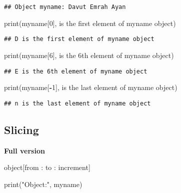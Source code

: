 \documentclass[
]{book}
\newenvironment{Shaded}{\begin{snugshade}}{\end{snugshade}}
\newcommand{\BuiltInTok}[1]{#1}
\newcommand{\DecValTok}[1]{\textcolor[rgb]{0.00,0.00,0.81}{#1}}
\newcommand{\NormalTok}[1]{#1}
\newcommand{\OperatorTok}[1]{\textcolor[rgb]{0.81,0.36,0.00}{\textbf{#1}}}
\newcommand{\StringTok}[1]{\textcolor[rgb]{0.31,0.60,0.02}{#1}}
\begin{document}
\begin{verbatim}
## Object myname: Davut Emrah Ayan
\end{verbatim}

\begin{Shaded}
\begin{Highlighting}[]
\BuiltInTok{print}\NormalTok{(myname[}\DecValTok{0}\NormalTok{], }\StringTok{\textquotesingle{}is the first element of myname object\textquotesingle{}}\NormalTok{)}
\end{Highlighting}
\end{Shaded}

\begin{verbatim}
## D is the first element of myname object
\end{verbatim}

\begin{Shaded}
\begin{Highlighting}[]
\BuiltInTok{print}\NormalTok{(myname[}\DecValTok{6}\NormalTok{], }\StringTok{\textquotesingle{}is the 6th element of myname object\textquotesingle{}}\NormalTok{)}
\end{Highlighting}
\end{Shaded}

\begin{verbatim}
## E is the 6th element of myname object
\end{verbatim}

\begin{Shaded}
\begin{Highlighting}[]
\BuiltInTok{print}\NormalTok{(myname[}\OperatorTok{{-}}\DecValTok{1}\NormalTok{], }\StringTok{\textquotesingle{}is the last element of myname object\textquotesingle{}}\NormalTok{)}
\end{Highlighting}
\end{Shaded}

\begin{verbatim}
## n is the last element of myname object
\end{verbatim}

\hypertarget{slicing}{%
\subsection{Slicing}\label{slicing}}

\textbf{Full version}

object{[}from : to : increment{]}

\begin{Shaded}
\begin{Highlighting}[]
\BuiltInTok{print}\NormalTok{(}\StringTok{"Object:"}\NormalTok{, myname)}
\end{Highlighting}
\end{Shaded}
\end{document}
